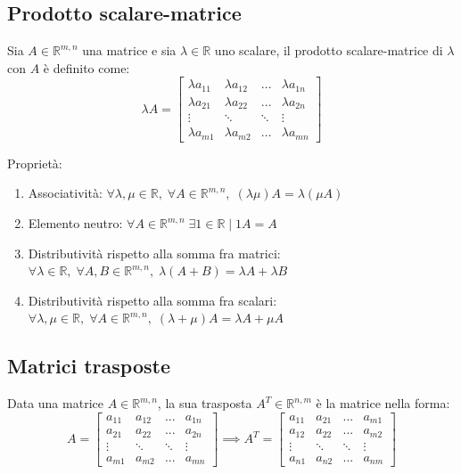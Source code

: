 \documentclass{article}
\begin{document}
\subsection{Prodotto scalare-matrice}
    Sia $A \in \mathbb{R}^{m, n}$ una matrice e sia $\lambda \in \mathbb{R}$ uno scalare, il prodotto scalare-matrice di $\lambda$ con $A$ è definito come:
    \[
    \lambda A = 
    \begin{bmatrix}
        \lambda a_{11} & \lambda a_{12} & ... & \lambda a_{1n} \\
        \lambda a_{21} & \lambda a_{22} & ... & \lambda a_{2n} \\
        \vdots & \ddots & \ddots & \vdots \\
        \lambda a_{m1} & \lambda a_{m2} & ... & \lambda a_{mn} 
    \end{bmatrix} 
    \]

    \vspace{10pt}
    Proprietà:
    \begin{enumerate}[label=(\arabic*)]
        \item Associatività: $\forall \lambda, \mu \in \mathbb{R}, \; \forall A \in \mathbb{R}^{m, n}, \; (\lambda \mu) A = \lambda (\mu A)$ 
        \item Elemento neutro: $\forall A \in \mathbb{R}^{m, n} \; \exists 1 \in \mathbb{R} \; | \; 1A = A$
        \item Distributività rispetto alla somma fra matrici: $\forall \lambda \in \mathbb{R}, \; \forall A, B \in \mathbb{R}^{m, n}, \; \lambda(A + B) = \lambda A + \lambda B$
        \item Distributività rispetto alla somma fra scalari: $\forall \lambda, \mu \in \mathbb{R}, \; \forall A \in \mathbb{R}^{m, n}, \; (\lambda + \mu)A = \lambda A + \mu A$
    \end{enumerate}



\subsection{Matrici trasposte}
    Data una matrice $A \in \mathbb{R}^{m, n}$, la sua trasposta $A^{T} \in \mathbb{R}^{n, m}$ è la matrice nella forma:
    \[
        A = 
        \begin{bmatrix}
            a_{11} & a_{12} & ... & a_{1n} \\
            a_{21} & a_{22} & ... & a_{2n} \\
            \vdots & \ddots & \ddots & \vdots \\
            a_{m1} & a_{m2} & ... & a_{mn} 
        \end{bmatrix} 
        \implies
        A^{T} = 
        \begin{bmatrix}
            a_{11} & a_{21} & ... & a_{m1} \\
            a_{12} & a_{22} & ... & a_{m2} \\
            \vdots & \ddots & \ddots & \vdots \\
            a_{n1} & a_{n2} & ... & a_{nm} 
        \end{bmatrix} 
    \]
\end{document}
